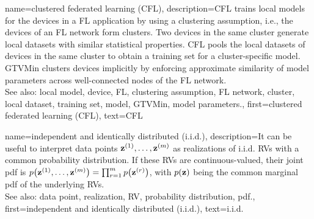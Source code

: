
	
{name={clustered federated learning (CFL)}, 
description={CFL trains local models for the 
 	devices in a FL application by using a clustering assumption, i.e., the devices 
 	of an FL network form clusters. Two devices in the same cluster generate 
 	local datasets with similar statistical properties. CFL pools the local datasets of devices 
 	in the same cluster to obtain a training set for a cluster-specific model. 
 	GTVMin clusters devices implicitly by enforcing approximate similarity of model parameters 
 	across well-connected nodes of the FL network.\\ 
 	See also: local model, device, FL, clustering assumption, FL network, cluster, local dataset, training set, model, GTVMin, model parameters.},
	first={clustered federated learning (CFL)},
	text={CFL} }

{name={independent and identically distributed (i.i.d.)}, 
  description={It can be useful to 
		interpret data points ${\bf z}^{(1)},\ldots,{\bf z}^{(m)}$ 
		as realizations of i.i.d. RVs with 
		a common probability distribution. If these RVs are continuous-valued, their joint pdf 
		is $p\big({\bf z}^{(1)},\ldots,{\bf z}^{(m)} \big) = \prod_{r=1}^{m} p \big({\bf z}^{(r)}\big)$, 
		with $p({\bf z})$ being the common 
		marginal pdf of the underlying RVs.
				\\
		See also: data point, realization, RV, probability distribution, pdf.},
	first={independent and identically distributed (i.i.d.)},
	text={i.i.d.} 
}


